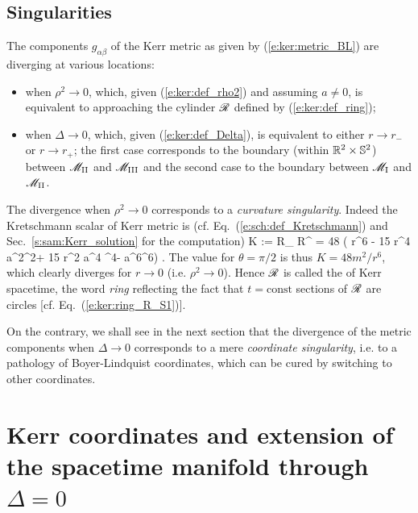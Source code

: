 \subsection{Singularities}

The components $g_{\alpha\beta}$ of the Kerr metric as given by  (\ref{e:ker:metric_BL})
are diverging at various locations:
\begin{itemize}
\item when $\rho^2\rightarrow 0$, which, given (\ref{e:ker:def_rho2})
and assuming $a\not=0$, is equivalent to approaching
the cylinder $\mathscr{R}$ defined by (\ref{e:ker:def_ring});
\item when $\Delta\rightarrow 0$, which, given (\ref{e:ker:def_Delta}), is equivalent to either $r\rightarrow r_-$
or $r\rightarrow r_+$; the first case corresponds to the boundary (within $\mathbb{R}^2\times\mathbb{S}^2$)
between $\mathscr{M}_{\rm II}$ and $\mathscr{M}_{\rm III}$ and the second case to the boundary
between $\mathscr{M}_{\rm I}$ and $\mathscr{M}_{\rm II}$.
\end{itemize}
The divergence when $\rho^2\rightarrow 0$ corresponds to a
\emph{curvature singularity}.
Indeed the Kretschmann scalar of Kerr metric is (cf.
Eq.~(\ref{e:sch:def_Kretschmann}) and Sec.~\ref{s:sam:Kerr_solution} for the computation)
\be
    K := R_{\mu\nu\rho\sigma} R^{\mu\nu\rho\sigma}
     = 48  \left( r^6 - 15 r^4 a^2\cos^2\th + 15 r^2 a^4 \cos^4\th - a^6\cos^6\th \right) .
\ee
The value for $\theta=\pi/2$ is thus $K = 48 m^2 / r^6$, which clearly diverges
for $r\rightarrow 0$ (i.e. $\rho^2\rightarrow 0$).
Hence $\mathscr{R}$ is called the
of Kerr spacetime, the word \emph{ring} reflecting the fact that $t=\mathrm{const}$
sections of $\mathscr{R}$ are circles [cf. Eq.~(\ref{e:ker:ring_R_S1})].

On the contrary, we shall see in the next section that the divergence
of the metric components when $\Delta\rightarrow 0$ corresponds to
a mere
\emph{coordinate singularity},
i.e. to a pathology of Boyer-Lindquist coordinates, which can be cured by switching to
other coordinates.


\section{Kerr coordinates and extension of the spacetime manifold through $\Delta=0$}

